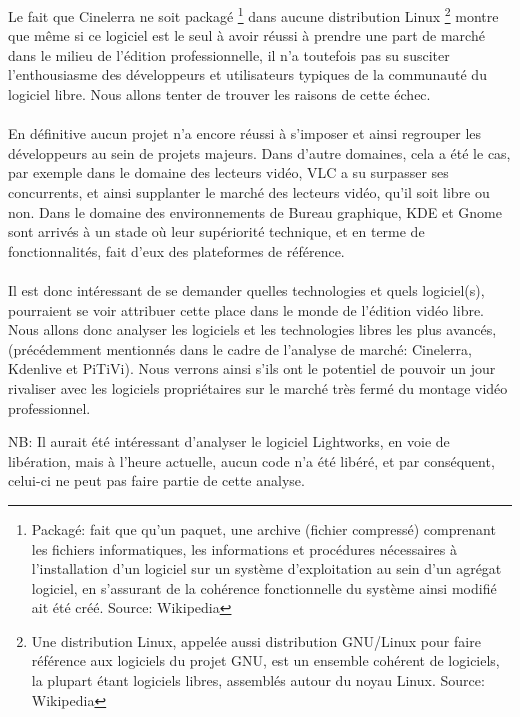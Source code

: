 Le fait que Cinelerra ne soit packagé \footnote{Packagé: fait
que qu'un paquet, une archive (fichier compressé) comprenant les
fichiers informatiques, les informations et procédures nécessaires
à l'installation d'un logiciel sur un système d'exploitation au sein
d'un agrégat logiciel, en s'assurant de la cohérence fonctionnelle
du système ainsi modifié ait été créé. Source: Wikipedia} dans
aucune distribution Linux \footnote {Une distribution Linux, appelée
aussi distribution GNU/Linux pour faire référence aux logiciels du
projet GNU, est un ensemble cohérent de logiciels, la plupart étant
logiciels libres, assemblés autour du noyau Linux. Source: Wikipedia}
montre que même si ce logiciel est le seul à avoir réussi à prendre
une part de marché dans le milieu de l'édition professionnelle,
il n'a toutefois pas su susciter l'enthousiasme des développeurs et
utilisateurs typiques de la communauté du logiciel libre. Nous allons
tenter de trouver les raisons de cette échec.

\paragraph{}

En définitive aucun projet n'a encore réussi à s'imposer et ainsi
regrouper les développeurs au sein de projets majeurs. Dans d'autre
domaines, cela a été le cas, par exemple dans le domaine des lecteurs
vidéo, VLC a su surpasser ses concurrents, et ainsi supplanter le
marché des lecteurs vidéo, qu'il soit libre ou non. Dans le domaine
des environnements de Bureau graphique, KDE et Gnome sont arrivés à un
stade où leur supériorité technique, et en terme de fonctionnalités,
fait d'eux des plateformes de référence.

\paragraph{}

Il est donc intéressant de se demander quelles technologies et quels
logiciel(s), pourraient se voir attribuer cette place dans le monde
de l'édition vidéo libre. Nous allons donc analyser les logiciels et
les technologies libres les plus avancés, (précédemment mentionnés
dans le cadre de l'analyse de marché: Cinelerra, Kdenlive et PiTiVi).
Nous verrons ainsi s'ils ont le potentiel de pouvoir un jour rivaliser
avec les logiciels propriétaires sur le marché très fermé du montage
vidéo professionnel.

NB: Il aurait été intéressant d'analyser le logiciel Lightworks,
en voie de libération, mais à l'heure actuelle, aucun code n'a été
libéré, et par conséquent, celui-ci ne peut pas faire partie de
cette analyse.

